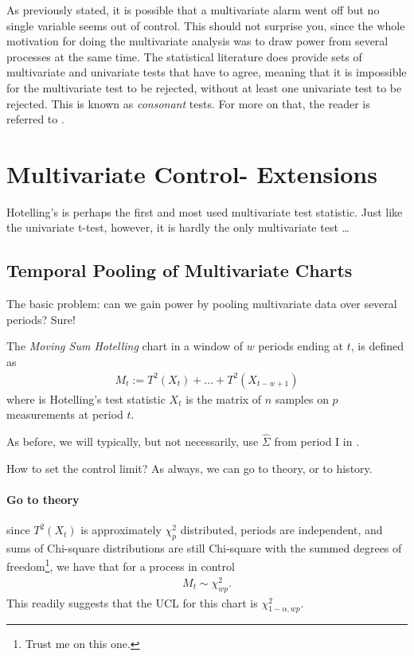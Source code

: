 \begin{extra}
As previously stated, it is possible that a multivariate alarm went off but no single variable seems out of control. 
This should not surprise you, since the whole motivation for doing the multivariate analysis was to draw power from several processes at the same time. 
The statistical literature does provide sets of multivariate and univariate tests that have to agree, meaning that it is impossible for the multivariate test to be rejected, without at least one univariate test to be rejected. 
This is known as \emph{consonant} tests. For more on that, the reader is referred to \cite{goeman_multiple_2011}.
\end{extra}







\section[Multivariate extensions]{Multivariate Control- Extensions}

Hotelling's \tsq is perhaps the first and most used multivariate test statistic.
Just like the univariate t-test, however, it is hardly the only multivariate test \dots





\subsection{Temporal Pooling of Multivariate Charts}
The basic problem: can we gain power by pooling multivariate data over several periods?
Sure!

\begin{definition}
	The \emph{Moving Sum Hotelling} chart in a window of $w$ periods ending at $t$, is defined as
	\begin{align}
	M_t:= T^2(X_t)+\dots+T^2(X_{t-w+1})
	\end{align}
	where \tsq is Hotelling's test statistic $X_t$ is the matrix of $n$ samples on $p$ measurements at period $t$. 
\end{definition}
As before, we will typically, but not necessarily, use $\hat{\Sigma}$ from period I in \tsq. 

How to set the control limit? 
As always, we can go to theory, or to history.

\paragraph{Go to theory}
since $T^2(X_t)$ is approximately $\chi^2_p$ distributed, periods are independent, and sums of Chi-square distributions are still Chi-square with the summed degrees of freedom\footnote{Trust me on this one.}, we have that for a process in control
\begin{align}
M_t \sim \chi^2_{wp}.
\end{align}
This readily suggests that the UCL for this chart is $\chi^2_{1-\alpha,wp}$. 

